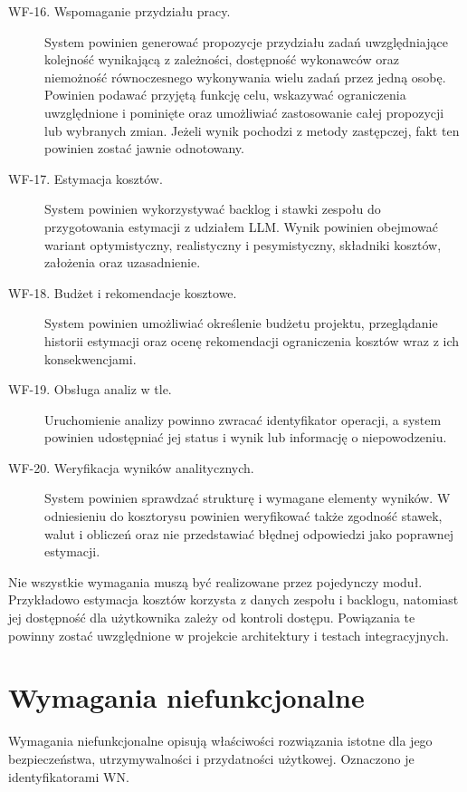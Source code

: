 \begin{description}
    \item[WF-16. Wspomaganie przydziału pracy.]
    System powinien generować propozycje przydziału zadań uwzględniające kolejność wynikającą z zależności, dostępność wykonawców oraz niemożność równoczesnego wykonywania wielu zadań przez jedną osobę. Powinien podawać przyjętą funkcję celu, wskazywać ograniczenia uwzględnione i pominięte oraz umożliwiać zastosowanie całej propozycji lub wybranych zmian. Jeżeli wynik pochodzi z metody zastępczej, fakt ten powinien zostać jawnie odnotowany.

    \item[WF-17. Estymacja kosztów.]
    System powinien wykorzystywać backlog i stawki zespołu do przygotowania estymacji z udziałem LLM. Wynik powinien obejmować wariant optymistyczny, realistyczny i pesymistyczny, składniki kosztów, założenia oraz uzasadnienie.

    \item[WF-18. Budżet i rekomendacje kosztowe.]
    System powinien umożliwiać określenie budżetu projektu, przeglądanie historii estymacji oraz ocenę rekomendacji ograniczenia kosztów wraz z ich konsekwencjami.

    \item[WF-19. Obsługa analiz w tle.]
    Uruchomienie analizy powinno zwracać identyfikator operacji, a system powinien udostępniać jej status i wynik lub informację o niepowodzeniu.

    \item[WF-20. Weryfikacja wyników analitycznych.]
    System powinien sprawdzać strukturę i wymagane elementy wyników. W odniesieniu do kosztorysu powinien weryfikować także zgodność stawek, walut i obliczeń oraz nie przedstawiać błędnej odpowiedzi jako poprawnej estymacji.
\end{description}

Nie wszystkie wymagania muszą być realizowane przez pojedynczy moduł. Przykładowo estymacja kosztów korzysta z danych zespołu i backlogu, natomiast jej dostępność dla użytkownika zależy od kontroli dostępu. Powiązania te powinny zostać uwzględnione w projekcie architektury i testach integracyjnych.


\section{Wymagania niefunkcjonalne}
\label{sec:wymagania-niefunkcjonalne}

Wymagania niefunkcjonalne opisują właściwości rozwiązania istotne dla jego bezpieczeństwa, utrzymywalności i przydatności użytkowej. Oznaczono je identyfikatorami WN.

